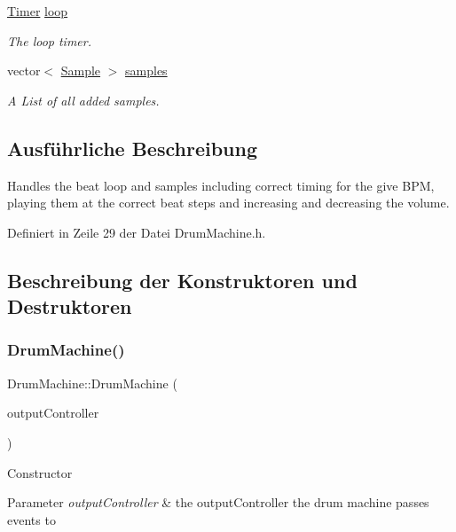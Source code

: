 \begin{DoxyCompactItemize}
\hyperlink{class_timer}{Timer} \hyperlink{class_drum_machine_ab190b1b114840e3fb41fff54d0099e93}{loop}
\begin{DoxyCompactList}\small\item\em The loop timer. \end{DoxyCompactList}\item 
vector$<$ \hyperlink{class_sample}{Sample} $>$ \hyperlink{class_drum_machine_acf215ead70c41e760556497281aa562e}{samples}
\begin{DoxyCompactList}\small\item\em A List of all added samples. \end{DoxyCompactList}\end{DoxyCompactItemize}


\subsection{Ausführliche Beschreibung}
Handles the beat loop and samples including correct timing for the give B\+PM, playing them at the correct beat steps and increasing and decreasing the volume. 

Definiert in Zeile 29 der Datei Drum\+Machine.\+h.



\subsection{Beschreibung der Konstruktoren und Destruktoren}
\mbox{\label{class_drum_machine_acacd501a2615a2f0215c04873860ce98}} 
\subsubsection{\texorpdfstring{Drum\+Machine()}{DrumMachine()}}
{\footnotesize\ttfamily Drum\+Machine\+::\+Drum\+Machine (\begin{DoxyParamCaption}\item[{\hyperlink{class_a_output_controller}{A\+Output\+Controller} \&}]{output\+Controller }\end{DoxyParamCaption})\hspace{0.3cm}{\ttfamily [explicit]}}

Constructor 
\begin{DoxyParams}{Parameter}
{\em output\+Controller} & the output\+Controller the drum machine passes events to \\
\hline
\end{DoxyParams}


